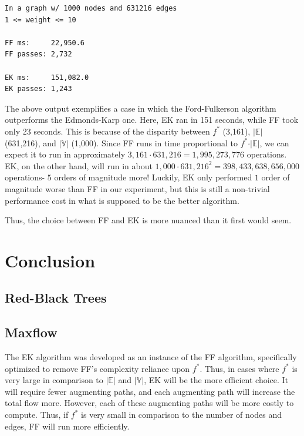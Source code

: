 \documentclass[12pt]{amsart}
\begin{document}
\begin{verbatim}
In a graph w/ 1000 nodes and 631216 edges
1 <= weight <= 10

FF ms:     22,950.6
FF passes: 2,732

EK ms:     151,082.0
EK passes: 1,243

\end{verbatim}

    The above output exemplifies a case in which the
    Ford-Fulkerson algorithm outperforms the Edmonds-Karp one.
    Here, EK ran in 151 seconds, while FF took only 23 seconds.
    This is because of the disparity between $f^*$ (3,161),
    $\vert \mathbb{E} \vert$ (631,216), and
    $\vert \mathbb{V} \vert$ (1,000). Since FF runs in time
    proportional to $f^* \cdot \vert \mathbb{E} \vert$, we can
    expect it to run in approximately
    $3,161 \cdot 631,216 = 1,995,273,776$ operations. EK, on the
    other hand, will run in about
    $1,000 \cdot 631,216^2 = 398,433,638,656,000$ operations-
    $5$ orders of magnitude more! Luckily, EK only performed $1$
    order of magnitude worse than FF in our experiment, but this
    is still a non-trivial performance cost in what is supposed
    to be the better algorithm.

    Thus, the choice between FF and EK is more nuanced than it
    first would seem.

\section{Conclusion}

\subsection{Red-Black Trees}
    

\subsection{Maxflow}

    The EK algorithm was developed as an instance of the FF
    algorithm, specifically optimized to remove FF's complexity
    reliance upon $f^*$. Thus, in cases where $f^*$ is very
    large in comparison to $\vert \mathbb{E} \vert$ and
    $\vert \mathbb{V} \vert$, EK will be the more efficient
    choice. It will require fewer augmenting paths, and each
    augmenting path will increase the total flow more. However,
    each of these augmenting paths will be more costly to
    compute. Thus, if $f^*$ is very small in comparison to the
    number of nodes and edges, FF will run more efficiently.
\end{document}

